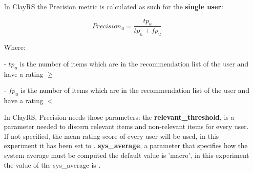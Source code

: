 \documentclass[12pt, a4paper]{article}
\begin{document}
\hfill\break
In ClayRS the Precision metric is calculated as such for the \textbf{single user}:

    \[
    Precision_u = \frac{tp_u}{tp_u + fp_u}
    \]

    Where:

    - $tp_u$ is the number of items which are in the recommendation list of the user and have a
      rating $\geq$ 


    - $fp_u$ is the number of items which are in the recommendation list of the user and have a
      rating $<$ 
    \hfill\break



In ClayRS, Precision needs those parameters:
\hfill\break
the \textbf{relevant\_threshold}, is a parameter needed to discern relevant items and non-relevant items for every user.
If not specified, the mean rating score of every user will be used, in this experiment it has been set to
\textbf{}.
\hfill\break\hfill\break
\textbf{sys\_average}, a parameter that specifies how the system average must be computed the default value is 'macro',
in this experiment the value of the sys\_average is \textbf{}.
\end{document}
